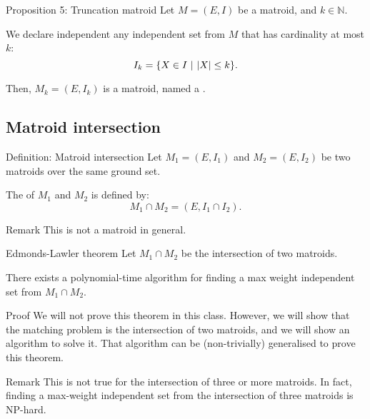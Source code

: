 \documentclass[a4paper]{article}
\begin{document}
\begin{parag}{Proposition 5: Truncation matroid}
    Let $M = \left(E, I\right)$ be a matroid, and $k \in \mathbb{N}$.

    We declare independent any independent set from $M$ that has cardinality at most $k$:
    \[I_k = \left\{X \in I \suchthat \left|X\right| \leq k \right\}.\]

    Then, $M_k = \left(E, I_k\right)$ is a matroid, named a .
\end{parag}

\subsection{Matroid intersection}

\begin{parag}{Definition: Matroid intersection}
    Let $M_1 = \left(E, I_1\right)$ and $M_2 = \left(E, I_2\right)$ be two matroids over the same ground set. 

    The  of $M_1$ and $M_2$ is defined by: 
    \[M_1 \cap M_2 = \left(E, I_1 \cap I_2\right).\]

    \begin{subparag}{Remark}
        This is not a matroid in general.
    \end{subparag}
\end{parag}

\begin{parag}{Edmonds-Lawler theorem}
    Let $M_1 \cap M_2$ be the intersection of two matroids. 

    There exists a polynomial-time algorithm for finding a max weight independent set from $M_1 \cap M_2$.

    \begin{subparag}{Proof}
        We will not prove this theorem in this class. However, we will show that the matching problem is the intersection of two matroids, and we will show an algorithm to solve it. That algorithm can be (non-trivially) generalised to prove this theorem.
    \end{subparag}

    \begin{subparag}{Remark}
        This is not true for the intersection of three or more matroids. In fact, finding a max-weight independent set from the intersection of three matroids is NP-hard.
    \end{subparag}
\end{parag}
\end{document}
